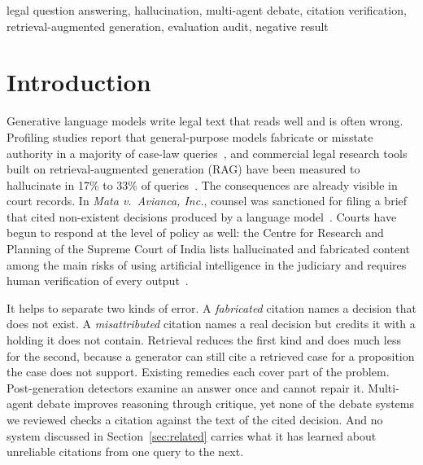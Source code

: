 \documentclass[conference]{IEEEtran}
\begin{document}
\begin{abstract}
\end{abstract}

\begin{IEEEkeywords}
legal question answering, hallucination, multi-agent debate, citation verification, retrieval-augmented generation, evaluation audit, negative result
\end{IEEEkeywords}

\section{Introduction}
Generative language models write legal text that reads well and is often wrong. Profiling studies report that general-purpose models fabricate or misstate authority in a majority of case-law queries~\cite{dahl2024}, and commercial legal research tools built on retrieval-augmented generation (RAG) have been measured to hallucinate in 17\% to 33\% of queries~\cite{magesh2025}. The consequences are already visible in court records. In \emph{Mata v.\ Avianca, Inc.}, counsel was sanctioned for filing a brief that cited non-existent decisions produced by a language model~\cite{mata2023}. Courts have begun to respond at the level of policy as well: the Centre for Research and Planning of the Supreme Court of India lists hallucinated and fabricated content among the main risks of using artificial intelligence in the judiciary and requires human verification of every output~\cite{sciwhitepaper2025}.

It helps to separate two kinds of error. A \emph{fabricated} citation names a decision that does not exist. A \emph{misattributed} citation names a real decision but credits it with a holding it does not contain. Retrieval reduces the first kind and does much less for the second, because a generator can still cite a retrieved case for a proposition the case does not support. Existing remedies each cover part of the problem. Post-generation detectors examine an answer once and cannot repair it. Multi-agent debate improves reasoning through critique, yet none of the debate systems we reviewed checks a citation against the text of the cited decision. And no system discussed in Section~\ref{sec:related} carries what it has learned about unreliable citations from one query to the next.
\end{document}
